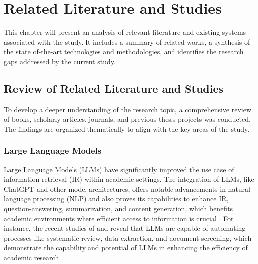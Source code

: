 \chapter{Related Literature and Studies}
\begin{refsection}

This chapter will present an analysis of relevant literature and existing systems associated with the study. It includes a summary of related works, a synthesis of the state of-the-art technologies and methodologies, and identifies the research gaps addressed by the current study.

\section{Review of Related Literature and Studies}
To develop a deeper understanding of the research topic, a comprehensive review of books, scholarly articles, journals, and previous thesis projects was conducted. The findings are organized thematically to align with the key areas of the study.

\subsection{Large Language Models}

\hspace{1cm}Large Language Models (LLMs) have significantly improved the use case of information retrieval (IR) within academic settings. The integration of LLMs, like ChatGPT and other model architectures, offers notable advancements in natural language processing (NLP) and also proves its capabilities to enhance IR, question-answering, summarization, and content generation, which benefits academic environments where efficient access to information is crucial \cite{yalamanchili2024quality} \cite{yang2023large}. For instance, the recent studies of \citeauthor{khraisha2024can} \citeyear{khraisha2024can} and \citeauthor{gartlehner2023data} \citeyear{gartlehner2023data} reveal that LLMs are capable of automating processes like systematic review, data extraction, and document screening, which demonstrate the capability and potential of LLMs in enhancing the efficiency of academic research \cite{khraisha2024can}  \cite{gartlehner2023data}.


\end{refsection}

